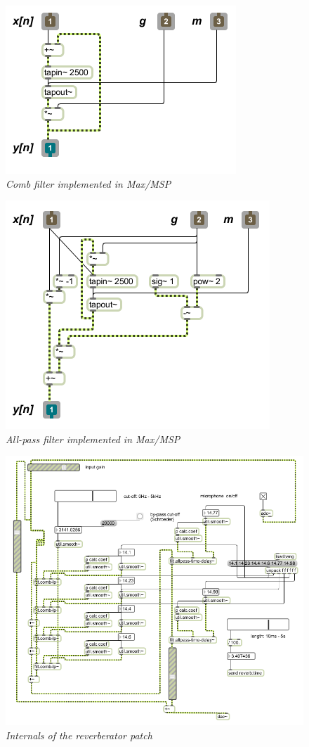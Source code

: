 \documentclass[12pt]{report}
\begin{document}
\begin{figure}
  \centering
  \includegraphics[scale=0.5]{images/filt.comb.png}
  \caption{\emph{Comb filter implemented in Max/MSP}}
  \label{max:comb}
\end{figure}
\begin{figure}
  \centering
  \includegraphics[scale=0.5]{images/filt.allpass.png}
  \caption{\emph{All-pass filter implemented in Max/MSP}}
  \label{max:allpass}
\end{figure}
\begin{figure}
  \centering
  \includegraphics[scale=0.5]{images/guts.png}
  \caption{\emph{Internals of the reverberator patch}}
  \label{max:guts}
\end{figure}





%
%


\end{document}
